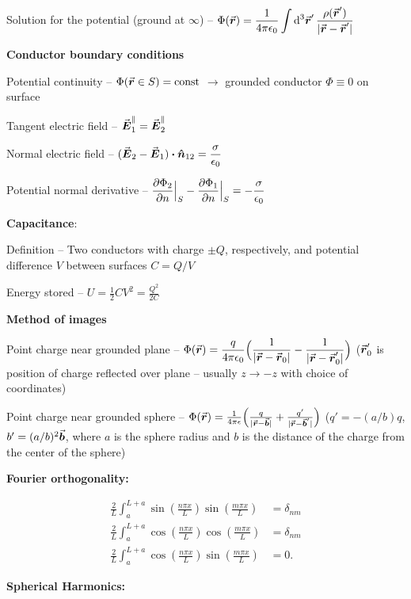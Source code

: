 Solution for the potential (ground at $\infty$) -- $\displaystyle \Phi(\va*{r}) = \frac{1}{4 \pi \epsilon_0} \int \dd[3]{\va*{r}'} \frac{\rho(\va*{r}')}{|\va*{r} - \va*{r}'|}$

\textbf{Conductor boundary conditions}

Potential continuity -- $\Phi(\va*{r} \in S) = {\rm const}$ $\rightarrow$ grounded conductor $\Phi \equiv 0$ on surface

Tangent electric field -- $\va*{E}_{1}^{\parallel} = \va*{E}_{2}^{\parallel}$

Normal electric field -- $\displaystyle (\va*{E}_{2} - \va*{E}_{1}) \vdot \vu*{n}_{12} = \frac{\sigma}{\epsilon_0}$

Potential normal derivative -- $\displaystyle \pdv{\Phi_{2}}{n}\Big|_{S} - \pdv{\Phi_1}{n}\Big|_{S} = -\frac{\sigma}{\epsilon_0}$

\textbf{Capacitance}:

Definition -- Two conductors with charge $\pm Q$, respectively, and potential difference $V$ between surfaces $C = Q/V$

Energy stored -- $\displaystyle U = \frac{1}{2} C V^2 = \frac{Q^2}{2 C}$

\textbf{Method of images}

Point charge near grounded plane -- $\displaystyle \Phi(\va*{r}) = \frac{q}{4 \pi \epsilon_0} \Big( \frac{1}{|\va*{r} - \va*{r}_{0}|} - \frac{1}{| \va*{r} - \va*{r}'_{0} |} \Big)$ ($\va*{r}'_{0}$ is position of charge reflected over plane -- usually $z \rightarrow -z$ with choice of coordinates)

Point charge near grounded sphere -- $\Phi(\va*{r}) = \frac{1}{4 \pi \epsilon} \Big( \frac{q}{|\va*{r} - \va*{b}|} + \frac{q'}{|\va*{r} - \va*{b}'|} \Big)$ ($q' = -(a/b)q$, $b' = (a/b)^2 \va*{b}$, where $a$ is the sphere radius and $b$ is the distance of the charge from the center of the sphere)

\textbf{Fourier orthogonality:}

\begin{align}
    \frac{2}{L}\int_{a}^{L+a} \sin(\frac{n \pi x}{L}) \sin(\frac{m \pi x}{L}) &= \delta_{nm} \\
    \frac{2}{L} \int_{a}^{L+a} \cos(\frac{n \pi x}{L}) \cos(\frac{m \pi x}{L}) &= \delta_{nm} \\
    \frac{2}{L} \int_{a}^{L+a} \cos(\frac{n \pi x}{L}) \sin(\frac{m \pi x}{L}) &= 0
.\end{align}

\textbf{Spherical Harmonics:}


